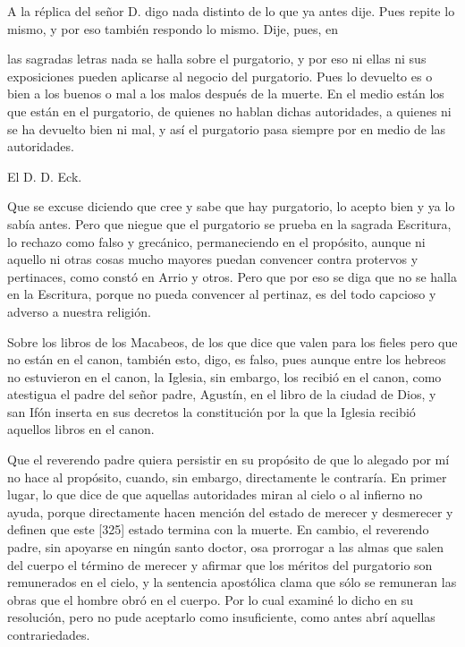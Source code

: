 A la réplica del señor D. digo nada distinto de lo que ya antes dije. Pues repite lo mismo, y por eso también respondo lo mismo. Dije, pues, en

las sagradas letras nada se halla sobre el purgatorio, y por eso ni ellas ni sus exposiciones pueden aplicarse al negocio del purgatorio. Pues lo devuelto es o bien a los buenos o mal a los malos después de la muerte. En el medio están los que están en el purgatorio, de quienes no hablan dichas autoridades, a quienes ni se ha devuelto bien ni mal, y así el purgatorio pasa siempre por en medio de las autoridades.

El D. D. Eck.

Que se excuse diciendo que cree y sabe que hay purgatorio, lo acepto bien y ya lo sabía antes. Pero que niegue que el purgatorio se prueba en la sagrada Escritura, lo rechazo como falso y grecánico, permaneciendo en el propósito, aunque ni aquello ni otras cosas mucho mayores puedan convencer contra protervos y pertinaces, como constó en Arrio y otros. Pero que por eso se diga que no se halla en la Escritura, porque no pueda convencer al pertinaz, es del todo capcioso y adverso a nuestra religión.

Sobre los libros de los Macabeos, de los que dice que valen para los fieles pero que no están en el canon, también esto, digo, es falso, pues aunque entre los hebreos no estuvieron en el canon, la Iglesia, sin embargo, los recibió en el canon, como atestigua el padre del señor padre, Agustín, en el libro de la ciudad de Dios, y san Ifón inserta en sus decretos la constitución por la que la Iglesia recibió aquellos libros en el canon.

Que el reverendo padre quiera persistir en su propósito de que lo alegado por mí no hace al propósito, cuando, sin embargo, directamente le contraría. En primer lugar, lo que dice de que aquellas autoridades miran al cielo o al infierno no ayuda, porque directamente hacen mención del estado de merecer y desmerecer y definen que este [325] estado termina con la muerte. En cambio, el reverendo padre, sin apoyarse en ningún santo doctor, osa prorrogar a las almas que salen del cuerpo el término de merecer y afirmar que los méritos del purgatorio son remunerados en el cielo, y la sentencia apostólica clama que sólo se remuneran las obras que el hombre obró en el cuerpo. Por lo cual examiné lo dicho en su resolución, pero no pude aceptarlo como insuficiente, como antes abrí aquellas contrariedades.

